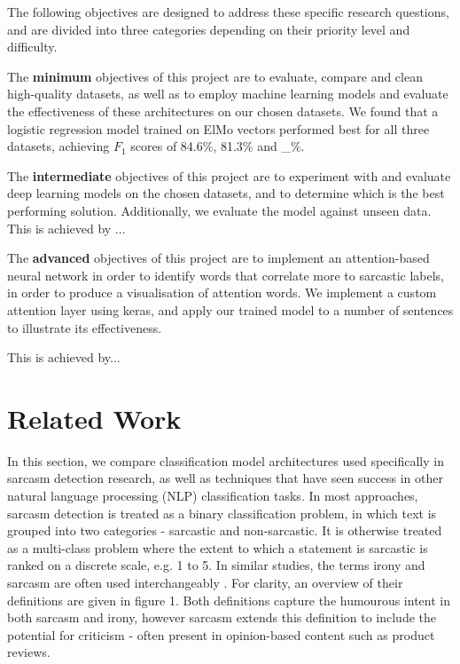 \documentclass[12pt,a4paper]{article}
\begin{document}
\noindent The following objectives are designed to address these specific research questions, and are divided into three categories depending on their priority level and difficulty.

The \textbf{minimum} objectives of this project are to evaluate, compare and clean high-quality datasets, as well as to employ machine learning models and evaluate the effectiveness of these architectures on our chosen datasets. We found that a logistic regression model trained on ElMo vectors performed best for all three datasets, achieving $F_{1}$ scores of 84.6\%, 81.3\% and \_\%. 

The \textbf{intermediate} objectives of this project are to experiment with and evaluate deep learning models on the chosen datasets, and to determine which is the best performing solution. Additionally, we evaluate the model against unseen data. This is achieved by ...

The \textbf{advanced} objectives of this project are to implement an attention-based neural network in order to identify words that correlate more to sarcastic labels, in order to produce a visualisation of attention words. We implement a custom attention layer using keras, and apply our trained model to a number of sentences to illustrate its effectiveness.

This is achieved by...





\newpage
\section{Related Work}
\noindent In this section, we compare classification model architectures used specifically in sarcasm detection research, as well as techniques that have seen success in other natural language processing (NLP) classification tasks. In most approaches, sarcasm detection is treated as a binary classification problem, in which text is grouped into two categories - sarcastic and non-sarcastic. It is otherwise treated as a multi-class problem where the extent to which a statement is sarcastic is ranked on a discrete scale, e.g. 1 to 5. 
In similar studies, the terms irony and sarcasm are often used interchangeably \cite{tsur2010icwsm}. For clarity, an overview of their definitions are given in figure 1. Both definitions capture the humourous intent in both sarcasm and irony, however sarcasm extends this definition to include the potential for criticism - often present in opinion-based content such as product reviews.\vspace{-10pt}
\end{document}
